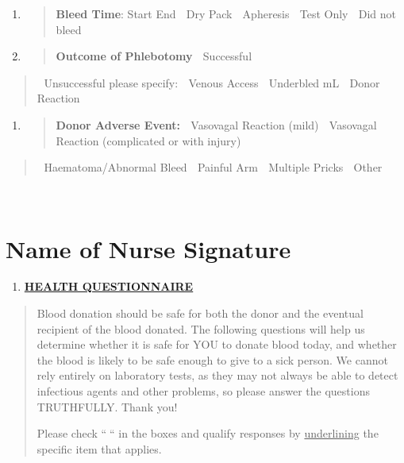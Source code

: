 \documentclass[]{article}
\begin{document}
\begin{longtable}[]
{\begin{minipage}[t]{\linewidth}
\begin{enumerate}
  \begin{enumerate}
  \def\labelenumii{\arabic{enumii}.}
  \setcounter{enumii}{2}
  \item
    \begin{quote}
    \textbf{Bleed Time}: Start End  Dry Pack  Apheresis  Test Only 
    Did not bleed
    \end{quote}
  \item
    \begin{quote}
    \textbf{Outcome of Phlebotomy}  Successful
    \end{quote}
  \end{enumerate}
\end{enumerate}

\begin{quote}
 Unsuccessful please specify:  Venous Access  Underbled mL  Donor
Reaction
\end{quote}

\begin{enumerate}
\def\labelenumi{\arabic{enumi}.}
\setcounter{enumi}{4}
\item
  \begin{quote}
  \textbf{Donor Adverse Event:}  Vasovagal Reaction (mild)  Vasovagal
  Reaction (complicated or with injury)
  \end{quote}
\end{enumerate}

\begin{quote}
 Haematoma/Abnormal Bleed  Painful Arm  Multiple Pricks  Other
\end{quote}
\end{minipage}} \\
\end{longtable}

\hypertarget{name-of-nurse-signature}{%
\section*{\texorpdfstring{Name of Nurse Signature
}{Name of Nurse Signature }}\label{name-of-nurse-signature}}

\begin{enumerate}
\def\labelenumi{\arabic{enumi}.}
\setcounter{enumi}{1}
\item
  \textbf{\ul{HEALTH QUESTIONNAIRE}}
\end{enumerate}

\begin{quote}
Blood donation should be safe for both the donor and the eventual
recipient of the blood donated. The following questions will help us
determine whether it is safe for YOU to donate blood today, and whether
the blood is likely to be safe enough to give to a sick person. We
cannot rely entirely on laboratory tests, as they may not always be able
to detect infectious agents and other problems, so please answer the
questions TRUTHFULLY. Thank you!

Please check ```` in the boxes and qualify responses by
\ul{underlining} the specific item that applies.
\end{quote}
\end{document}
